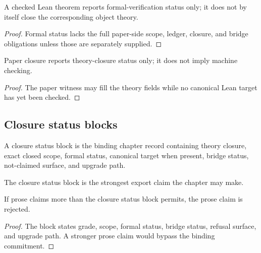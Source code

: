 \begin{corollary}
\label{cor:philosophy-checked-not-closed}
A checked Lean theorem reports formal-verification status only; it does
not by itself close the corresponding object theory.
\end{corollary}
\begin{proof}
Formal status lacks the full paper-side scope, ledger, closure, and
bridge obligations unless those are separately supplied.
\end{proof}

\begin{corollary}
\label{cor:philosophy-paper-closed-not-machine-checked}
Paper closure reports theory-closure status only; it does not imply
machine checking.
\end{corollary}
\begin{proof}
The paper witness may fill the theory fields while no canonical Lean
target has yet been checked.
\end{proof}


\subsection{Closure status blocks}
\label{subsec:philosophy-closure-status-blocks}

\begin{definition}
\label{def:philosophy-closure-status-block}
A closure status block is the binding chapter record containing theory
closure, exact closed scope, formal status, canonical target when
present, bridge status, not-claimed surface, and upgrade path.
\end{definition}

\begin{definition}
\label{def:philosophy-binding-commitment}
The closure status block is the strongest export claim the chapter may
make.
\end{definition}

\begin{theorem}
\label{thm:philosophy-closure-status-bounds-prose}
If prose claims more than the closure status block permits, the prose
claim is rejected.
\end{theorem}
\begin{proof}
The block states grade, scope, formal status, bridge status, refusal
surface, and upgrade path. A stronger prose claim would bypass the
binding commitment.
\end{proof}

